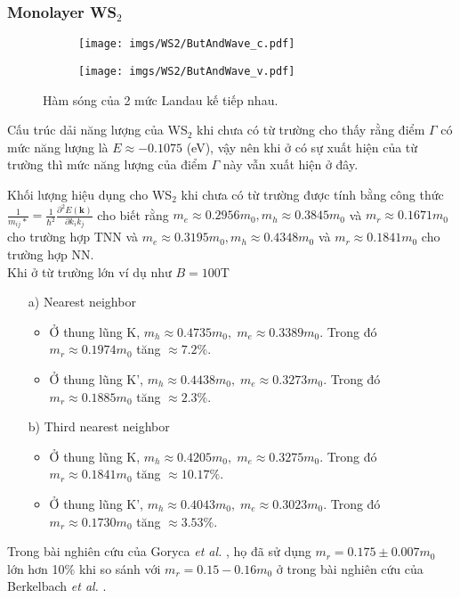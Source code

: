 \documentclass{article}
\begin{document}
\newpage
\subsubsection*{Monolayer WS$_{2}$}
\begin{figure}[htb]
	\begin{subfigure}{0.495\textwidth}
		\centering
		\texttt{[image: imgs/WS2/ButAndWave\_c.pdf]}
	\end{subfigure}
	\begin{subfigure}{0.495\textwidth}
		\centering
		\texttt{[image: imgs/WS2/ButAndWave\_v.pdf]}
	\end{subfigure}
	\caption{Hàm sóng của 2 mức Landau kế tiếp nhau.}
\end{figure}

Cấu trúc dải năng lượng của WS$_{2}$ khi chưa có từ trường cho thấy rằng điểm $\Gamma$ có mức năng lượng là $E \approx -0.1075$ (eV), vậy nên khi ở có sự xuất hiện của từ trường thì mức năng lượng của điểm $\Gamma$ này vẫn xuất hiện ở đây. 

Khối lượng hiệu dụng cho WS$_{2}$ khi chưa có từ trường được tính bằng công thức $\frac{1}{m_{ij}*} =\frac{1}{\hbar^{2}} \frac{\partial^{2} E(\mathbf{k})}{\partial k_{i} k_{j}}$ cho biết rằng $m_{e} \approx 0.2956 m_{0}, m_{h} \approx 0.3845 m_{0}$ và $m_{r} \approx 0.1671 m_{0}$ cho trường hợp TNN và $m_{e} \approx 0.3195 m_{0}, m_{h} \approx 0.4348 m_{0}$ và $m_{r} \approx 0.1841 m_{0}$ cho trường hợp NN.\\
Khi ở từ trường lớn ví dụ như $B = 100 $T
\begin{itemize}
	\item[a)] Nearest neighbor
	\begin{itemize}
		\item Ở thung lũng K, $m_{h} \approx 0.4735 m_{0},\; m_{e} \approx 0.3389 m_{0}$. 
		Trong đó $m_{r} \approx 0.1974 m_{0}$ tăng $\approx 7.2\%$.
		
		\item Ở thung lũng K', $m_{h} \approx 0.4438 m_{0},\; m_{e} \approx 0.3273 m_{0}$. 
		Trong đó $m_{r} \approx 0.1885 m_{0}$ tăng $\approx 2.3\%$.
	\end{itemize}
	\item[b)] Third nearest neighbor
	\begin{itemize}
		\item Ở thung lũng K, $m_{h} \approx 0.4205 m_{0},\; m_{e} \approx 0.3275 m_{0}$. 
		Trong đó $m_{r} \approx 0.1841 m_{0}$ tăng $\approx 10.17\%$.
		
		\item Ở thung lũng K', $m_{h} \approx 0.4043 m_{0},\; m_{e} \approx 0.3023 m_{0}$. 
		Trong đó $m_{r} \approx 0.1730 m_{0}$ tăng $\approx 3.53\%$.
	\end{itemize}
\end{itemize}
Trong bài nghiên cứu của Goryca \textit{et al.} \cite{goryca2019}, họ đã sử dụng $m_{r} = 0.175 \pm 0.007 m_{0}$ lớn hơn 10\% khi so sánh với $m_{r} = 0.15 - 0.16 m_{0}$ ở trong bài nghiên cứu của Berkelbach \textit{et al.} \cite{berkelbach2013}.
\end{document}
